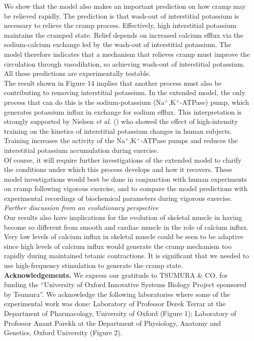 \documentclass[fleqn,10pt]{physiome}
\begin{document}
We show that the model also makes an important prediction on how cramp may be relieved rapidly. The prediction is that wash-out of interstitial potassium is necessary to relieve the cramp process. Effectively, high interstitial potassium maintains the cramped state. Relief depends on increased calcium efflux via the sodium-calcium exchange led by the wash-out of interstitial potassium. The model therefore indicates that a mechanism that relieves cramp must improve the circulation through vasodilation, so achieving wash-out of interstitial potassium. All these predictions are experimentally testable.\\\newline
The result shown in Figure 14 implies that another process must also be contributing to removing interstitial potassium. In the extended model, the only process that can do this is the sodium-potassium (Na$^+$,K$^+$-ATPase) pump, which generates potassium influx in exchange for sodium efflux. This interpretation is strongly supported by Nielsen \textit{et al.} (\citep{nielsen2004effects}) who showed the effect of high-intensity training on the kinetics of interstitial potassium changes in human subjects. Training increases the activity of the Na$^+$,K$^+$-ATPase pumps and reduces the interstitial potassium accumulation during exercise. \\\newline
Of course, it will require further investigations of the extended model to clarify the conditions under which this process develops and how it recovers. These model investigations would best be done in conjunction with human experiments on cramp following vigorous exercise, and to compare the model predictions with experimental recordings of biochemical parameters during vigorous exercise. \\\newline
\textit{Further discussion from an evolutionary perspective}\\\newline
Our results also have implications for the evolution of skeletal muscle in having become so different from smooth and cardiac muscle in the role of calcium influx. Very low levels of calcium influx in skeletal muscle could be seen to be adaptive since high levels of calcium influx would generate the cramp mechanism too rapidly during maintained tetanic contractions. It is significant that we needed to use high-frequency stimulation to generate the cramp state.\\\newline
\textbf{Acknowledgements.} We express our gratitude to TSUMURA \& CO. for funding the “University of Oxford Innovative Systems Biology Project sponsored by Tsumura”. We acknowledge the following laboratories where some of the experimental work was done: Laboratory of Professor Derek Terrar at the Department of Pharmacology, University of Oxford (Figure 1); Laboratory of Professor Anant Parekh at the Department of Physiology, Anatomy and Genetics, Oxford University (Figure 2).\newpage


\end{document}
